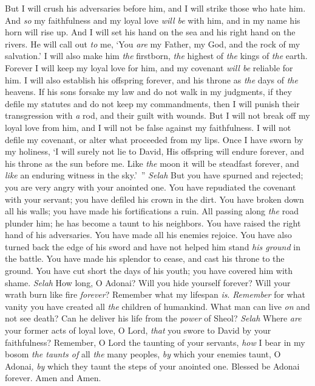 \begin{biblechapter}
\verse But I will crush his adversaries before him, 
and I will strike those who hate him.
\verse And \textit{so} my faithfulness 
and my loyal love \textit{will be} with him, 
and in my name his horn will rise up.
\verse And I will set his hand on the sea 
and his right hand on the rivers.
\verse He will call out \textit{to} me, ‘You \textit{are} my Father, 
my God, and the rock of my salvation.’
\verse I will also make him \textit{the} firstborn, 
\textit{the} highest of \textit{the} kings of \textit{the} earth.
\verse Forever I will keep my loyal love for him, 
and my covenant \textit{will be} reliable for him.
\verse I will also establish his offspring forever, 
and his throne as \textit{the} days of \textit{the} heavens.
\verse If his sons forsake my law 
and do not walk in my judgments,
\verse if they defile my statutes 
and do not keep my commandments,
\verse then I will punish their transgression with \textit{a} rod, 
and their guilt with wounds.
\verse But I will not break off my loyal love from him, 
and I will not be false against my faithfulness.
\verse I will not defile my covenant, 
or alter what proceeded from my lips.
\verse Once I have sworn by my holiness, 
‘I will surely not lie to David,
\verse His offspring will endure forever, 
and his throne as the sun before me.
\verse Like \textit{the} moon it will be steadfast forever, 
and \textit{like} an enduring witness in the sky.’ ” \textit{Selah}
\verse But you have spurned and rejected; 
you are very angry with your anointed one.
\verse You have repudiated the covenant with your servant; 
you have defiled his crown in the dirt.
\verse You have broken down all his walls; 
you have made his fortifications a ruin.
\verse All passing along \textit{the} road plunder him; 
he has become a taunt to his neighbors.
\verse You have raised the right hand of his adversaries. 
You have made all his enemies rejoice.
\verse You have also turned back the edge of his sword 
and have not helped him stand \textit{his ground} in the battle.
\verse You have made his splendor to cease, 
and cast his throne to the ground.
\verse You have cut short the days of his youth; 
you have covered him with shame. \textit{Selah}
\verse How long, O Adonai? Will you hide yourself forever? 
Will your wrath burn like fire \textit{forever}?
\verse Remember what my lifespan \textit{is}. 
\textit{Remember} for what vanity 
you have created all \textit{the} children of humankind.
\verse What man can live \textit{on} and not see death? 
Can he deliver his life from the \textit{power} of Sheol? \textit{Selah}
\verse Where \textit{are} your former acts of loyal love, O Lord, 
\textit{that} you swore to David by your faithfulness?
\verse Remember, O Lord the taunting of your servants, 
\textit{how} I bear in my bosom \textit{the taunts of} all \textit{the} many peoples,
\verse \textit{by} which your enemies taunt, O Adonai, 
\textit{by} which they taunt the steps of your anointed one.
\verse Blessed be Adonai forever. 
Amen and Amen.
\end{biblechapter}

